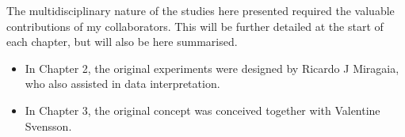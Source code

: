 
\begin{contributions}

The multidisciplinary nature of the studies here presented required the valuable contributions of my collaborators. This will be further detailed at the start of each chapter, but will also be here summarised.

\begin{itemize}
\item In Chapter 2, the original experiments were designed by Ricardo J Miragaia, who also assisted in data interpretation.
\item In Chapter 3, the original concept was conceived together with Valentine Svensson.
\end{itemize}


\end{contributions}
